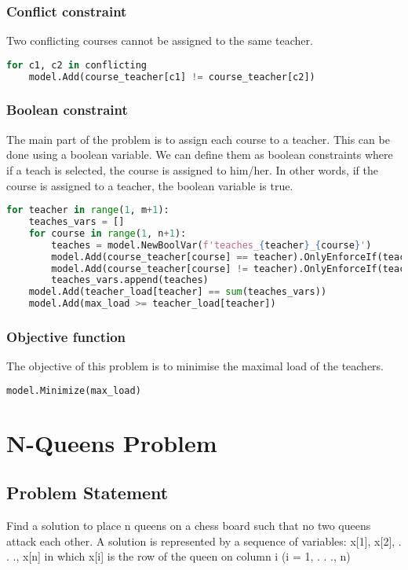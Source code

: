 \documentclass{article}
\begin{document}
\subsubsection{Conflict constraint}
Two conflicting courses cannot be assigned to the same teacher.
\begin{lstlisting}[language=Python]
for c1, c2 in conflicting
    model.Add(course_teacher[c1] != course_teacher[c2])
\end{lstlisting}

\subsubsection{Boolean constraint}
The main part of the problem is to assign each course to a teacher. 
This can be done using a boolean variable. 
We can define them as boolean constraints where if a teach is selected, the course is assigned to him/her. 
In other words, if the course is assigned to a teacher, the boolean variable is true.

\begin{lstlisting}[language=Python]
for teacher in range(1, m+1):
    teaches_vars = []
    for course in range(1, n+1):
        teaches = model.NewBoolVar(f'teaches_{teacher}_{course}')
        model.Add(course_teacher[course] == teacher).OnlyEnforceIf(teaches)
        model.Add(course_teacher[course] != teacher).OnlyEnforceIf(teaches.Not())
        teaches_vars.append(teaches)
    model.Add(teacher_load[teacher] == sum(teaches_vars))
    model.Add(max_load >= teacher_load[teacher])
\end{lstlisting}

\subsubsection{Objective function}
The objective of this problem is to minimise the maximal load of the teachers.
\begin{lstlisting}[language=Python]
model.Minimize(max_load)
\end{lstlisting}

\pagebreak

\section{N-Queens Problem}
\subsection{Problem Statement}
Find a solution to place n queens on a chess board such that no two queens attack each other.
A solution is represented by a sequence of variables: x[1], x[2], . . ., x[n] in which x[i]
is the row of the queen on column i (i = 1, . . ., n)
\end{document}
